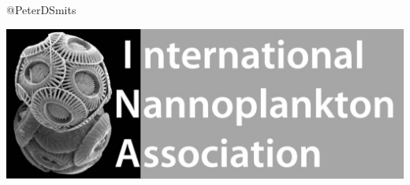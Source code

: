 \documentclass{beamer}
\begin{document}
\begin{frame}
\begin{columns}
\begin{column}{0.5\textwidth}
\begin{center}
        @PeterDSmits
      \end{center}
      \vspace*{0.02\textheight}
      \begin{center}
        \includegraphics[height=0.25\textheight,width=\textwidth,keepaspectratio=true]{figure/INAlogo}
      \end{center}
    \end{column}
  \end{columns}
\end{frame}
\end{document}
